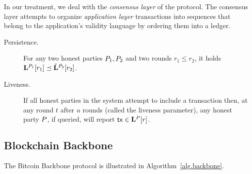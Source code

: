 In our treatment, we deal with the \emph{consensus layer}
of the protocol. The consensus layer attempts to organize
\emph{application layer} transactions into sequences that belong to the
application's validity language by ordering them into a ledger.

\begin{definition}[Ledger]
\end{definition}

\begin{description}
  \item[Persistence.]
    For any two honest parties $P_1,P_2$ and two rounds $r_1\leq r_2$,
    it holds  $\mathbf{L}^{P_1}[r_1] \preceq
    \check{\mathbf{L}}^{P_2}[r_2]$.

  \item[Liveness.]
    If all honest parties in the system attempt to include a  transaction
    then, at any round $t$ after $u$ rounds (called the
    liveness parameter), any honest party $P$, if queried,
    will report $\mathsf{tx} \in \mathbf{L}^{P}[r]$.
\end{description}


\subsection{Blockchain Backbone}

\cite{backbone,pass-asynchronous,varbackbone}

The Bitcoin Backbone protocol is illustrated in Algorithm~\ref{alg.backbone}.




